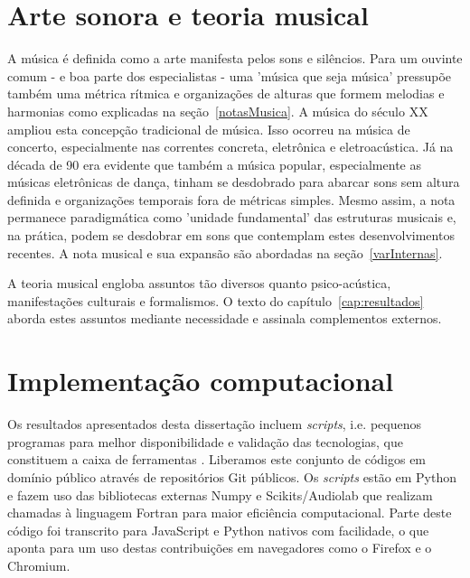     \section{Arte sonora e teoria musical}

A música é definida como a arte manifesta pelos sons e silêncios. Para um ouvinte comum - e boa parte dos especialistas - uma 'música que seja música' pressupõe também uma métrica rítmica e organizações de alturas que formem melodias e harmonias como explicadas na seção~\ref{notasMusica}. A música do século XX ampliou esta concepção tradicional de música. Isso ocorreu na música de concerto, especialmente nas correntes concreta, eletrônica e eletroacústica. Já na década de 90 era evidente que também a música popular, especialmente as músicas eletrônicas de dança, tinham se desdobrado para abarcar sons sem altura definida e organizações temporais fora de métricas simples. Mesmo assim, a nota permanece paradigmática como 'unidade fundamental' das estruturas musicais e, na prática, podem se desdobrar em sons que contemplam estes desenvolvimentos recentes. A nota musical e sua expansão são abordadas na seção~\ref{varInternas}.\cite{Wisnick,Webern,Lerdahl,Cook}

A teoria musical engloba assuntos tão diversos quanto psico-acústica, manifestações culturais e formalismos. O texto do capítulo~\ref{cap:resultados} aborda estes assuntos mediante necessidade e assinala complementos externos.\cite{Zamacois,Schoenberg,microsound}



    \section{Implementação computacional}
Os resultados apresentados desta dissertação incluem \emph{scripts}, i.e. pequenos programas para melhor disponibilidade e validação das tecnologias, que constituem a caixa de ferramentas \massa. Liberamos este conjunto de códigos em domínio público através de repositórios Git públicos.\cite{gitBook}
Os \emph{scripts} estão em Python e fazem uso das bibliotecas externas Numpy e Scikits/Audiolab que realizam chamadas à linguagem Fortran para maior eficiência computacional. Parte deste código foi transcrito para JavaScript e Python nativos com facilidade, o que aponta para um uso destas contribuições em navegadores como o Firefox e o Chromium.\cite{numpy,audiolab,tutPython,python}

